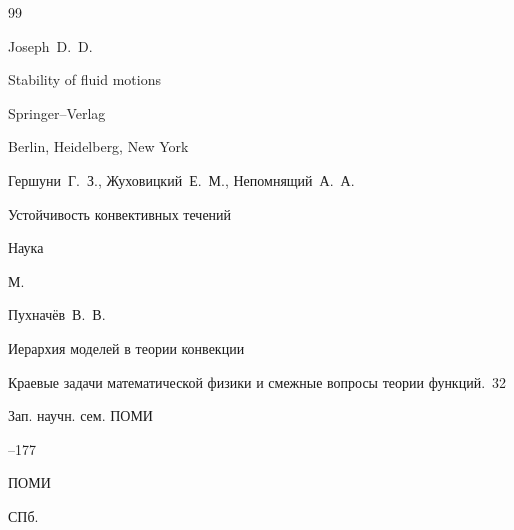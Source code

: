 \pagebreak





\begin{thebibliography}{99} 




\by Joseph~D.~D.

\book Stability of fluid motions


\publ Springer–Verlag

\publaddr Berlin, Heidelberg, New York







\by Гершуни~Г.~З., Жуховицкий~Е.~М., Непомнящий~А.~А.

\book Устойчивость конвективных течений


\publ Наука

\publaddr М.













\by Пухначёв~В.~В.

\paper Иерархия моделей в теории конвекции

\inbook Краевые задачи математической физики и смежные вопросы теории функций\rm.~32

\serial Зап. научн. сем. ПОМИ



--177

\publ ПОМИ

\publaddr СПб.



\end{thebibliography}
